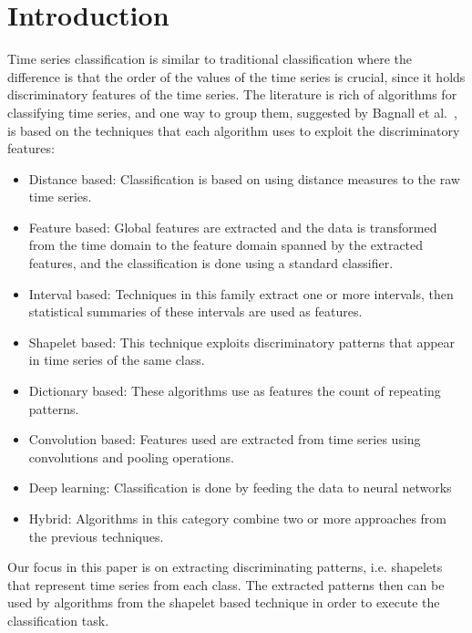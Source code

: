\documentclass[sigconf, nonacm]{acmart}
\begin{document}
\section{Introduction}
Time series classification is similar to traditional classification where the
difference is that the order of the values of the time series is crucial, since 
it holds discriminatory features of the time series. The literature is rich of
algorithms for classifying time series, and one way to group them,
suggested by Bagnall et al.~\cite{bake_off}, is based on the techniques that
each algorithm uses to exploit the discriminatory features:
\begin{itemize}
	\item Distance based: Classification is based on using distance measures to
	      the raw time series.
	\item Feature based: Global features are extracted and the data is transformed
	      from the time domain to the feature domain spanned by the extracted
	      features, and the classification is done using a standard classifier.
	\item Interval based: Techniques in this family extract one or more intervals,
	      then statistical summaries of these intervals are used as features.
	\item Shapelet based: This technique exploits discriminatory patterns that
	      appear in time series of the same class.
	\item Dictionary based: These algorithms use as features the count of
	      repeating patterns.
	\item Convolution based: Features used are extracted from time series using
	      convolutions and pooling operations.
	\item Deep learning: Classification is done by feeding the data to neural
	      networks
	\item Hybrid: Algorithms in this category combine two or more approaches from
	      the previous techniques.
\end{itemize}
Our focus in this paper is on extracting discriminating patterns, i.e. shapelets
that represent time series from each class. The extracted patterns then can be 
used by algorithms from the shapelet based technique in order to execute the
classification task.
\end{document}

